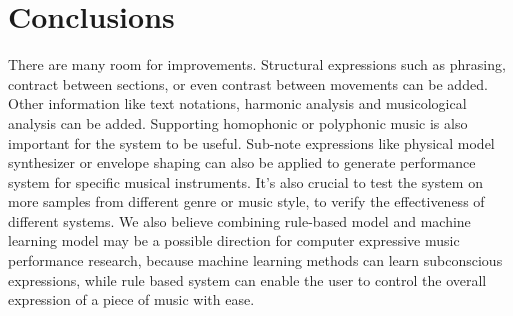 \chapter{Conclusions}

There are many room for improvements. Structural expressions such as phrasing, contract between sections, or even contrast between movements can be added. Other information like text notations, harmonic analysis and musicological analysis can be added. Supporting homophonic or polyphonic music is also important for the system to be useful. Sub-note expressions like physical model synthesizer or envelope shaping can also be applied to generate performance system for specific musical instruments.  It's also crucial to test the system on more samples from different genre or music style, to verify the effectiveness of different systems. We also believe combining rule-based model and machine learning model may be a possible direction for computer expressive music performance research, because machine learning methods can learn subconscious expressions, while rule based system can enable the user to control the overall expression of a piece of music with ease.

